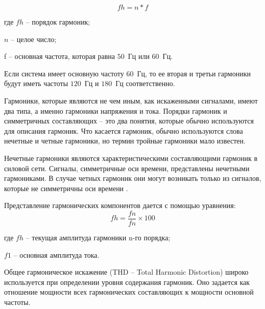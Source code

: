 \begin{equation}
	\label{eq:equation1.11}
	fh = n * f
\end{equation} 

где $fh$ – порядок гармоник;

$n$ – целое число;

f – основная частота, которая равна $50$~Гц или $60$~Гц.

Если система имеет основную частоту $60$~Гц, то ее вторая и третьи гармоники будут иметь частоты $120$~Гц и $180$~Гц соответственно.


Гармоники, которые являются не чем иным, как искаженными сигналами, имеют два типа, а именно гармоники напряжения и тока. Порядки гармоник и симметричных составляющих – это два понятия, которые обычно используются для описания гармоник. Что касается гармоник, обычно используются слова нечетные и четные гармоники, но термин тройные гармоники мало известен.

Нечетные гармоники являются характеристическими составляющими гармоник в силовой сети. Сигналы, симметричные оси времени, представлены нечетными гармониками. В случае четных гармоник они могут возникать только из сигналов, которые не симметричны оси времени \cite{soni2014review}.
 
Представление гармонических компонентов дается с помощью уравнения:  
\begin{equation}
	\label{eq:equation1.12}
	fh = \frac{fn}{fn}\times 100
\end{equation} 

где $fh$ – текущая амплитуда гармоники n-го порядка;

$f1$ – основная амплитуда тока.

Общее гармоническое искажение (THD – Total Harmonic Distortion) широко используется при определении уровня содержания гармоник. Оно задается как отношение мощности всех гармонических составляющих к мощности основной частоты.

